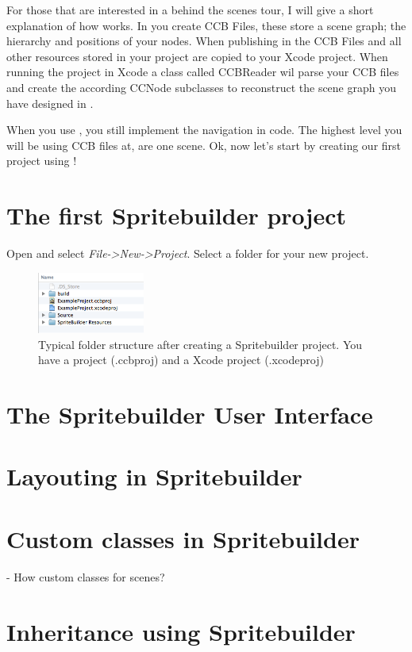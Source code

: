 For those that are interested in a behind the scenes tour, I will give a short
explanation of how \spriteb{} works. In \spriteb{} you create CCB Files, these
store a scene graph; the hierarchy and positions of your nodes. When publishing
in \spriteb the CCB Files and all other resources stored in your \spriteb{}
project are copied to your Xcode project.
When running the project in Xcode a class called CCBReader wil parse your CCB
files and create the according CCNode subclasses to reconstruct the scene graph
you have designed in \spriteb{}.

When you use \spriteb{}, you still implement the navigation in code. The highest
level you will be using CCB files at, are one scene. 
Ok, now let's start by creating our first project using \spriteb{}!

\section{The first Spritebuilder project}
Open \spriteb{} and select \textit{File->New->Project}. Select a folder for your
new project. 

\begin{figure}
		\centering
		\includegraphics[width=100pt]{images/spritebuilder_project_folderstructure.png}     
		\caption{Typical folder structure after creating a Spritebuilder project. You
		have a \spriteb{} project (.ccbproj)  and a Xcode project (.xcodeproj)}
\end{figure}

\section{The Spritebuilder User Interface}

\section{Layouting in Spritebuilder}

\section{Custom classes in Spritebuilder}
- How custom classes for scenes?

\section{Inheritance using Spritebuilder}